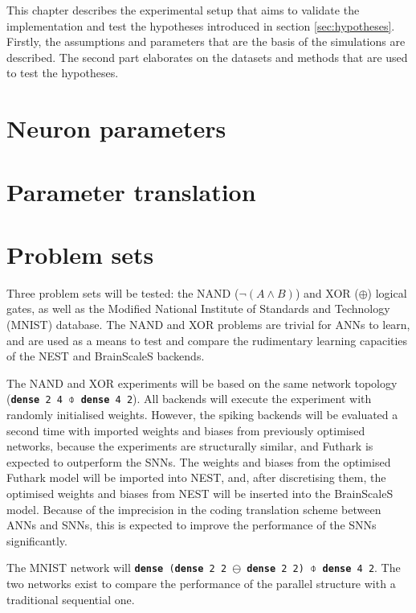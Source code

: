 \documentclass[report.tex]{subfiles}
\begin{document}
This chapter describes the experimental setup that aims to validate the
implementation and test the hypotheses introduced in section \ref{sec:hypotheses}.
Firstly, the assumptions and parameters that are the basis of the simulations are described. The second part elaborates on the datasets and methods that are used to test the hypotheses.

\section{Neuron parameters}


\section{Parameter translation}


\section{Problem sets}
Three problem sets will be tested: the NAND ($\neg(A \land B)$) and XOR
($\oplus$) logical gates, as well as the 
Modified National Institute of Standards and Technology
(MNIST) database.
The NAND and XOR problems are trivial for \glspl{ANN} to learn, and are used as
a means to test and compare the rudimentary learning capacities of the NEST and
BrainScaleS backends.

The NAND and XOR experiments will be based on the same network topology
(\texttt{\textbf{dense} 2 4 $\obar$ \textbf{dense} 4 2}). 
All backends will execute the experiment with randomly initialised weights. However, the spiking backends will be evaluated
a second time with imported weights and biases from previously optimised networks, because the experiments are structurally similar, and Futhark is
expected to outperform the \glspl{SNN}.
The weights and biases from the optimised Futhark model will be imported into NEST,
and, after discretising them, the optimised weights and biases from NEST will be
inserted into the BrainScaleS model.
Because of the imprecision in the coding translation scheme between \glspl{ANN} and
\glspl{SNN}, this is expected to improve the performance of the \glspl{SNN} significantly.

The MNIST network will 
\texttt{\textbf{dense} (\textbf{dense} 2 2 $\ominus$ \textbf{dense} 2 2) $\obar$ \textbf{dense} 4 2}.
The two networks exist to compare the performance of the parallel structure with 
a traditional sequential one.
\end{document}
